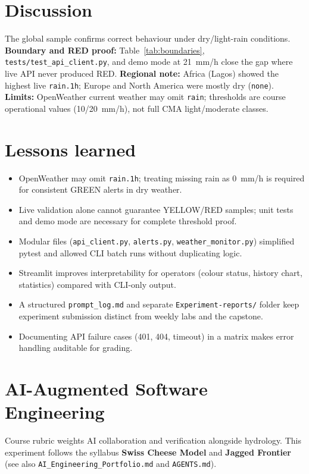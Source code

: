 \documentclass[11pt,a4paper]{article}
\begin{document}
\section{Discussion}
The global sample confirms correct behaviour under dry/light-rain conditions. \textbf{Boundary and RED proof:} Table~\ref{tab:boundaries}, \texttt{tests/test\_api\_client.py}, and demo mode at 21~mm/h close the gap where live API never produced RED. \textbf{Regional note:} Africa (Lagos) showed the highest live \texttt{rain.1h}; Europe and North America were mostly dry (\texttt{none}). \textbf{Limits:} OpenWeather current weather may omit \texttt{rain}; thresholds are course operational values (10/20~mm/h), not full CMA light/moderate classes.

\section{Lessons learned}
\begin{itemize}[noitemsep]
  \item OpenWeather may omit \texttt{rain.1h}; treating missing rain as 0~mm/h is required for consistent GREEN alerts in dry weather.
  \item Live validation alone cannot guarantee YELLOW/RED samples; unit tests and demo mode are necessary for complete threshold proof.
  \item Modular files (\texttt{api\_client.py}, \texttt{alerts.py}, \texttt{weather\_monitor.py}) simplified pytest and allowed CLI batch runs without duplicating logic.
  \item Streamlit improves interpretability for operators (colour status, history chart, statistics) compared with CLI-only output.
  \item A structured \texttt{prompt\_log.md} and separate \texttt{Experiment-reports/} folder keep experiment submission distinct from weekly labs and the capstone.
  \item Documenting API failure cases (401, 404, timeout) in a matrix makes error handling auditable for grading.
\end{itemize}

\section{AI-Augmented Software Engineering}
\label{sec:ai-eng}

Course rubric weights AI collaboration and verification alongside hydrology. This experiment follows the syllabus \textbf{Swiss Cheese Model} and \textbf{Jagged Frontier} (see also \texttt{AI\_Engineering\_Portfolio.md} and \texttt{AGENTS.md}).
\end{document}
